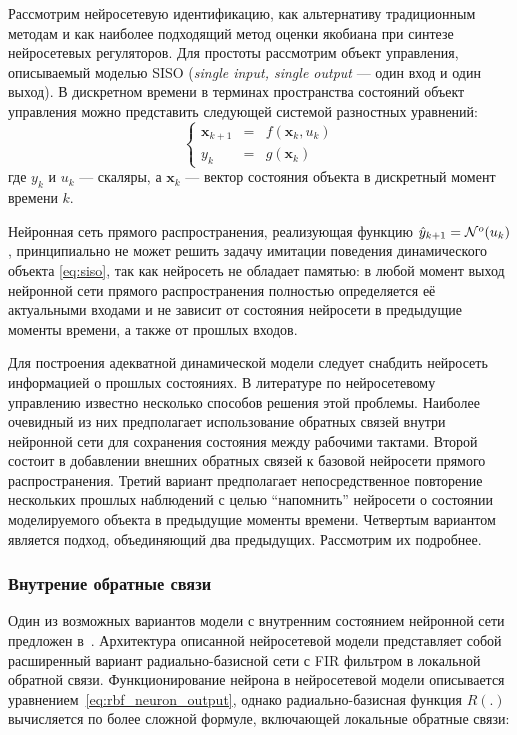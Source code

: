 
Рассмотрим нейросетевую идентификацию, как альтернативу традиционным
методам и как наиболее подходящий метод оценки якобиана при синтезе
нейросетевых регуляторов.  Для простоты рассмотрим объект управления,
описываемый моделью SISO ({\it single input, single output} --- один
вход и один выход).  В дискретном времени в терминах пространства
состояний объект управления можно представить следующей системой
разностных уравнений:
\begin{equation}\label{eq:siso}
\left\{\begin{array}{rcl}
  \mathbf{x}_{k+1} & = & f(\mathbf{x}_k, u_k) \\
  y_k & = & g(\mathbf{x}_k)
\end{array}\right.
\end{equation} где $y_k$ и $u_k$ --- скаляры, а $\mathbf{x}_k$ --- вектор
состояния объекта в дискретный момент времени $k$.

Нейронная сеть прямого распространения, реализующая функцию
$\hat{y}_{k+1} = \mathcal{N}^o(u_k)$, принципиально не может решить задачу
имитации поведения динамического объекта \eqref{eq:siso}, так как
нейросеть не обладает памятью: в любой момент выход нейронной сети
прямого распространения полностью определяется её актуальными
входами и не зависит от состояния нейросети в предыдущие моменты
времени, а также от прошлых входов.

Для построения адекватной динамической модели следует снабдить
нейросеть информацией о прошлых состояниях.  В литературе по
нейросетевому управлению известно несколько способов решения этой
проблемы.  Наиболее очевидный из них предполагает использование
обратных связей внутри нейронной сети для сохранения состояния между
рабочими тактами.  Второй состоит в добавлении внешних обратных связей
к базовой нейросети прямого распространения.  Третий вариант
предполагает непосредственное повторение нескольких прошлых наблюдений
с целью ``напомнить'' нейросети о состоянии моделируемого объекта в
предыдущие моменты времени.  Четвертым вариантом является подход,
объединяющий два предыдущих.  Рассмотрим их подробнее.

\subsubsection{Внутрение обратные связи}

Один из возможных вариантов модели с внутренним состоянием нейронной
сети предложен в~\cite{boquete99}.  Архитектура описанной нейросетевой
модели представляет собой расширенный вариант радиально-базисной сети
с FIR фильтром в локальной обратной связи.  Функционирование нейрона в
нейросетевой модели описывается
уравнением~\eqref{eq:rbf_neuron_output}, однако радиально-базисная
функция $R(.)$ вычисляется по более сложной формуле, включающей
локальные обратные связи:

